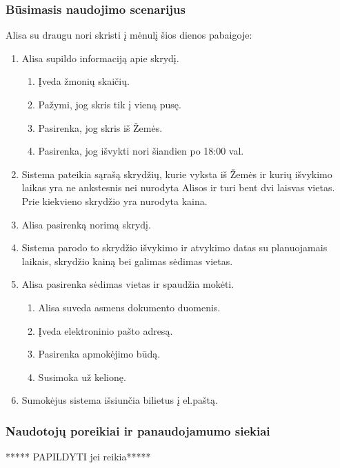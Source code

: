\documentclass{VUMIFPSkursinis}
\begin{document}
\subsubsection{Būsimasis naudojimo scenarijus}
Alisa su draugu nori skristi į mėnulį šios dienos pabaigoje:
\begin{enumerate}
\item  Alisa supildo informaciją apie skrydį.
\begin{enumerate}[label*=\arabic*.]
\item Įveda žmonių skaičių.
\item Pažymi, jog skris tik į vieną pusę.
\item Pasirenka, jog skris iš Žemės.
\item  Pasirenka, jog išvykti nori šiandien po 18:00 val.
\end{enumerate}
\item  Sistema pateikia sąrašą skrydžių, kurie vyksta iš Žemės ir kurių išvykimo laikas yra ne ankstesnis nei nurodyta Alisos ir turi bent dvi laisvas vietas. Prie kiekvieno skrydžio yra nurodyta kaina.
\item Alisa pasirenką norimą skrydį.
\item Sistema parodo to skrydžio išvykimo ir atvykimo datas su planuojamais laikais, skrydžio kainą bei galimas sėdimas vietas.
\item Alisa pasirenka sėdimas vietas ir spaudžia mokėti.
\begin{enumerate}[label*=\arabic*.]
\item Alisa suveda asmens dokumento duomenis.
\item Įveda elektroninio pašto adresą.
\item Pasirenka apmokėjimo būdą.
\item  Susimoka už kelionę.
\end{enumerate}
\item   Sumokėjus sistema išsiunčia  bilietus į el.paštą.
\end{enumerate}

\subsubsection{Naudotojų poreikiai ir panaudojamumo siekiai}
\centerline{***** PAPILDYTI jei reikia*****}


\printbibliography[heading=bibintoc, title=Šaltiniai]  %
\end{document}
